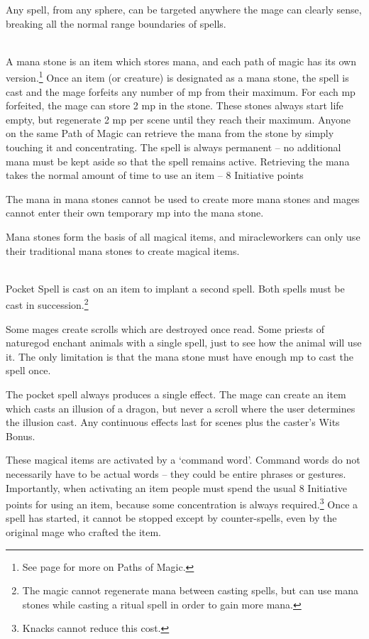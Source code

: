 \begin{multicols}{2}

Any spell, from any sphere, can be targeted anywhere the mage can clearly sense, breaking all the normal range boundaries of spells.

\\
A mana stone is an item which stores mana, and each path of magic has its own version.\footnote{See page \pageref{magic_paths} for more on Paths of Magic.}
Once an item (or creature) is designated as a mana stone, the spell is cast and the mage forfeits any number of \gls{mp} from their maximum.
For each \gls{mp} forfeited, the mage can store 2 \gls{mp} in the stone.
These stones always start life empty, but regenerate 2 \gls{mp} per scene until they reach their maximum.
Anyone on the same Path of Magic can retrieve the mana from the stone by simply touching it and concentrating.
The spell is always permanent -- no additional mana must be kept aside so that the spell remains active.
Retrieving the mana takes the normal amount of time to use an item -- 8 Initiative points

The mana in mana stones cannot be used to create more mana stones and mages cannot enter their own temporary \gls{mp} into the mana stone.

Mana stones form the basis of all magical items, and \glspl{miracleworker} can only use their traditional mana stones to create magical items.

\spelllevel

\\
Pocket Spell is cast on an item to implant a second spell.
Both spells must be cast in succession.\footnote{The magic cannot regenerate mana between casting spells, but can use mana stones while casting a ritual spell in order to gain more mana.}

Some mages create scrolls which are destroyed once read.  Some priests of \gls{naturegod} enchant animals with a single spell, just to see how the animal will use it.
The only limitation is that the mana stone must have enough \gls{mp} to cast the spell once.

The pocket spell always produces a single effect.
The mage can create an item which casts an illusion of a dragon, but never a scroll where the user determines the illusion cast.
Any continuous effects last for  scenes plus the caster's Wits Bonus.

These magical items are activated by a `command word'.
Command words do not necessarily have to be actual words -- they could be entire phrases or gestures.
Importantly, when activating an item people must spend the usual 8 Initiative points for using an item, because some concentration is always required.\footnote{Knacks cannot reduce this cost.}
Once a spell has started, it cannot be stopped except by counter-spells, even by the original mage who crafted the item.


\end{multicols}
